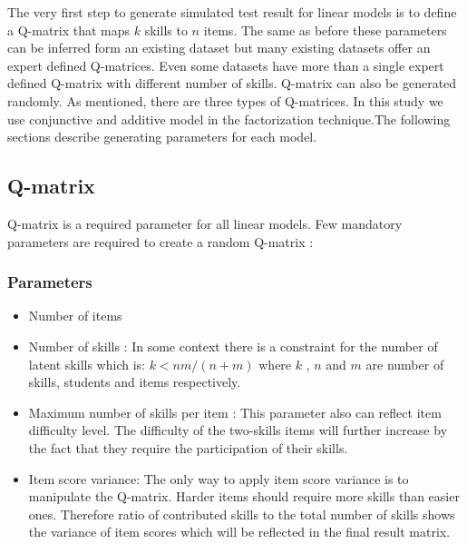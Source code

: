 The very first step to generate simulated test result for linear models is to define a Q-matrix that maps $k$ skills to $n$ items. The same as before these parameters can be inferred form an existing dataset but many existing datasets offer an expert defined Q-matrices. Even some datasets have more than a single expert defined Q-matrix with different number of skills. Q-matrix can also be generated randomly. As mentioned, there are three types of Q-matrices. In this study we use conjunctive and additive model in the factorization technique.The following sections describe generating parameters for each model.

\subsection{Q-matrix}

Q-matrix is a required parameter for all linear models. Few mandatory parameters are required to create a random Q-matrix :

\subsubsection{Parameters}
\begin{itemize}
\item Number of items 
\item Number of skills : In some context there is a constraint for the number of latent skills which is: $k<nm/(n+m)$ \protect\citep{lee1999learning} where $k$ , $n$ and $m$ are number of skills, students and items respectively.
\item Maximum number of skills per item : This parameter also can reflect item difficulty level. The difficulty of the two-skills items will further increase by the fact that they require the participation of their skills.
\item Item score variance: The only way to apply item score variance is to manipulate the Q-matrix. Harder items should require more skills than easier ones. Therefore ratio of contributed skills to the total number of skills shows the variance of item scores which will be reflected in the final result matrix.

\end{itemize}


